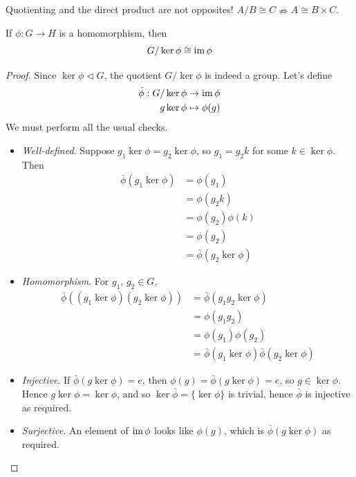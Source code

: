 \documentclass{../template/note}
\begin{document}
    \begin{remark*}
        Quotienting and the direct product are not opposites! \(A / B \cong C \nRightarrow A \cong B \times C\).
    \end{remark*}
    
    \begin{theorem}
        If \(\phi: G \to H\) is a homomorphism, then
        \[
            G/\ker \phi \cong \operatorname{im} \phi
        \]
        \label{isomorphism-theorem}
    \end{theorem}
    
    \begin{proof}
        Since \(\ker \phi \triangleleft G\), the quotient \(G/\ker \phi\) is indeed a group. Let's define
        \begin{align*}
            \bar\phi: G/\ker\phi &\to \operatorname{im} \phi \\
            g \ker \phi &\mapsto \phi(g)
        \end{align*}
        We must perform all the usual checks.
        \begin{itemize}
            \item \emph{Well-defined}. Suppose \(g_1 \ker \phi = g_2 \ker \phi\), so \(g_1 = g_2 k\) for some \(k \in \ker \phi\). Then
            \begin{align*}
                \bar\phi(g_1 \ker \phi) &= \phi(g_1) \\
                &= \phi(g_2k) \\
                &= \phi(g_2)\phi(k) \\
                &= \phi(g_2) \\
                &= \bar\phi(g_2 \ker \phi)
            \end{align*}
            \item \emph{Homomorphism}. For \(g_1\), \(g_2 \in G\),
            \begin{align*}
                \bar\phi((g_1 \ker \phi)(g_2 \ker \phi)) &= \bar\phi(g_1g_2 \ker \phi) \\
                &= \phi(g_1g_2) \\
                &= \phi(g_1)\phi(g_2) \\
                &= \bar\phi(g_1 \ker \phi)\bar\phi(g_2 \ker \phi)
            \end{align*}
            \item \emph{Injective}. If \(\bar\phi(g \ker \phi) = e\), then \(\phi(g) = \bar\phi(g \ker \phi) = e\), so \(g \in \ker \phi\). Hence \(g \ker \phi = \ker \phi\), and so \(\ker \bar\phi = \{\ker \phi\}\) is trivial, hence \(\bar\phi\) is injective as required.
            \item \emph{Surjective}. An element of \(\operatorname{im} \phi\) looks like \(\phi(g)\), which is \(\bar\phi(g \ker \phi)\) as required.           
        \end{itemize}
    \end{proof}
    
\end{document}
